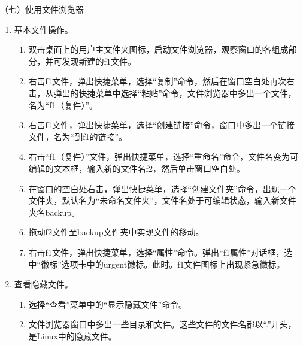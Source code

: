 \vspace{0.1in}
（七）使用文件浏览器
\begin{enumerate}
  \item 基本文件操作。
    \begin{enumerate}
      \item 双击桌面上的用户主文件夹图标，启动文件浏览器，观察窗口的各组成部分，并可发现新建的f1文件。
      \item 右击f1文件，弹出快捷菜单，选择“复制”命令，然后在窗口空白处再次右击，从弹出的快捷菜单中选择“粘贴”命令，文件浏览器中多出一个文件，名为“f1（复件）”。
      \item 右击f1文件，弹出快捷菜单，选择“创建链接”命令，窗口中多出一个链接文件，名为“到f1的链接”。
      \item 右击“f1（复件）”文件，弹出快捷菜单，选择“重命名”命令，文件名变为可编辑的文本框，输入新的文件名f2，然后单击窗口空白处。
      \item 在窗口的空白处右击，弹出快捷菜单，选择“创建文件夹”命令，出现一个文件夹，默认名为“未命名文件夹”，文件名处于可编辑状态，输入新文件夹名backup。
      \item 拖动f2文件至backup文件夹中实现文件的移动。
      \item 右击f1文件，弹出快捷菜单，选择“属性”命令。弹出“f1属性”对话框，选中“徽标”选项卡中的urgent徽标。此时。f1文件图标上出现紧急徽标。
    \end{enumerate}
  \item 查看隐藏文件。
    \begin{enumerate}
      \item 选择“查看”菜单中的“显示隐藏文件”命令。
      \item 文件浏览器窗口中多出一些目录和文件。这些文件的文件名都以“.”开头，是Linux中的隐藏文件。
    \end{enumerate}
\end{enumerate}

